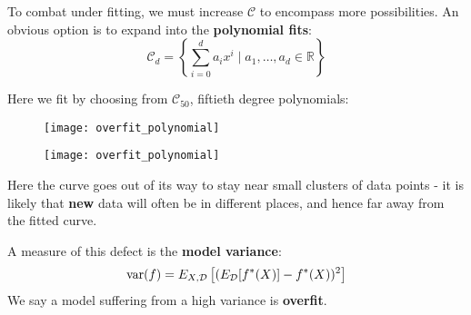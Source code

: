 %
\begin{frame}
  To combat under fitting, we must increase $\mathcal{C}$ to encompass more possibilities. An obvious option is to expand into the \textbf{polynomial fits}:
  $$\mathcal{C}_d = \left\{ \sum_{i=0}^{d} a_i x^i \mid a_1, \ldots, a_d \in \mathbb{R} \right\}$$
\end{frame}
%
\begin{frame}
  Here we fit by choosing from $\mathcal{C}_{50}$, fiftieth degree polynomials:
  \begin{figure}
    \texttt{[image: overfit\_polynomial]}
  \end{figure}
\end{frame}
%
\begin{frame}
  \begin{figure}
    \texttt{[image: overfit\_polynomial]}
  \end{figure}
  Here the curve goes out of its way to stay near small clusters of data points - it is likely that \textbf{new} data will often be in different places, and hence far away from the fitted curve.
\end{frame}
%
\begin{frame}
  A measure of this defect is the \textbf{model variance}:
  $$ \operatorname*{var}(f) = E_{X, \mathcal{D}} \left[ (E_{\mathcal{D}}[f^*(X)] - f^*(X))^2 \right] $$
  We say a model suffering from a high variance is \textbf{overfit}.
\end{frame}
